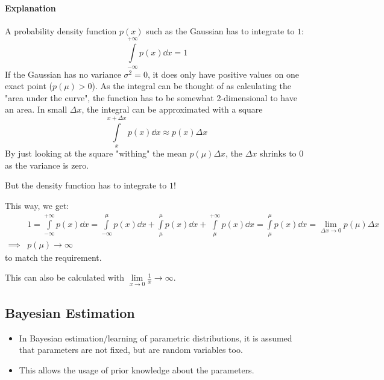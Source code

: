 			\paragraph{Explanation}
				A probability density function \( p(x) \) such as the Gaussian has to integrate to \(1\):
				\begin{equation}
					\int\limits_{-\infty}^{+\infty} p(x) \dd{x} = 1
				\end{equation}
				If the Gaussian has no variance \( \sigma^2 = 0 \), it does only have positive values on one exact point (\( p(\mu) > 0 \)). As the integral can be thought of as calculating the "area under the curve", the function has to be somewhat 2-dimensional to have an area. In small \( \Delta x \), the integral can be approximated with a square
				\begin{equation}
					\int\limits_{x}^{x + \Delta x} p(x) \dd{x} \approx p(x) \Delta x
				\end{equation}
				By just looking at the square "withing" the mean \( p(\mu) \Delta x \), the \(\Delta x\) shrinks to \(0\) as the variance is zero.

				But the density function has to integrate to \(1\)!

				This way, we get:
				\begin{align}
					         & 1 = \int\limits_{-\infty}^{+\infty} p(x) \dd{x} = \int\limits_{-\infty}^\mu p(x) \dd{x} + \int\limits_{\mu}^\mu p(x) \dd{x} + \int\limits_\mu^{+\infty} p(x) \dd{x} = \int\limits_{\mu}^\mu p(x) \dd{x} = \lim\limits_{\Delta x \to 0} p(\mu) \Delta x \\
					\implies & p(\mu) \to \infty
				\end{align}
				to match the requirement.

				This can also be calculated with \( \lim\limits_{x \to 0} \frac{1}{x} \to \infty \).

		\subsection{Bayesian Estimation}
			\begin{itemize}
				\item In Bayesian estimation/learning of parametric distributions, it is assumed that parameters are not fixed, but are random variables too.
				\item This allows the usage of prior knowledge about the parameters.
			\end{itemize}

